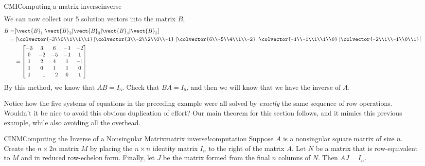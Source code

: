 \begin{example}{CMI}{Computing a matrix inverse}{inverse}
\begin{align*}
%
\end{align*}
%
We can now collect our 5 solution vectors into the matrix $B$,
%
\begin{align*}
B=
&[\vect{B}_1|\vect{B}_2|\vect{B}_3|\vect{B}_4|\vect{B}_5]\\
=&
\left[\colvector{-3\\0\\1\\1\\1}
\left\lvert\colvector{3\\-2\\2\\0\\-1}\right.
\left\lvert\colvector{6\\-5\\4\\1\\-2}\right.
\left\lvert\colvector{-1\\-1\\1\\1\\0}\right.
\left\lvert\colvector{-2\\1\\-1\\0\\1}\right.
\right]\\
&=
\begin{bmatrix}
 -3 & 3 & 6 & -1 & -2 \\
 0 & -2 & -5 & -1 & 1 \\
 1 & 2 & 4 & 1 & -1 \\
 1 & 0 & 1 & 1 & 0 \\
 1 & -1 & -2 & 0 & 1
\end{bmatrix}
\end{align*}
%
By this method, we know that $AB=I_5$.  Check that $BA=I_5$, and then we will know that we have the inverse of $A$.
\end{example}
%
Notice how the five systems of equations in the preceding example were all solved by {\em exactly} the same sequence of row operations.  Wouldn't it be nice to avoid this obvious duplication of effort?  Our main theorem for this section follows, and it mimics this previous example, while also avoiding all the overhead.
%
\begin{theorem}{CINM}{Computing the Inverse of a Nonsingular Matrix}{matrix inverse!computation}
Suppose $A$ is a nonsingular square matrix of size $n$.  Create the $n\times 2n$ matrix $M$ by placing the $n\times n$ identity matrix $I_n$ to the right of the matrix $A$.  Let $N$ be a matrix that is row-equivalent to $M$ and in reduced row-echelon form.  Finally,  let $J$ be the matrix formed from the final $n$ columns of $N$. Then $AJ=I_n$.
\end{theorem}

